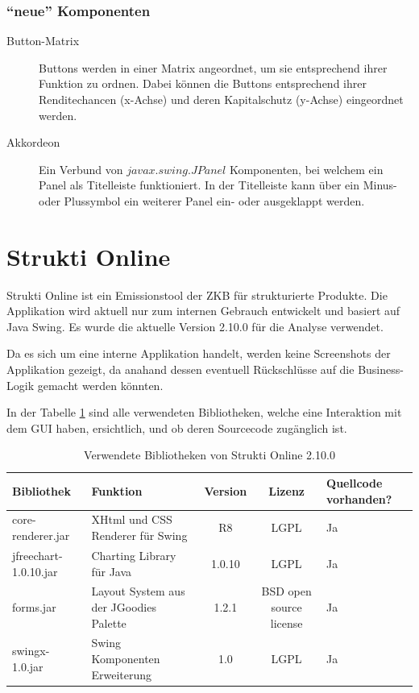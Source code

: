   \subsubsection{``neue'' Komponenten}
  
  \begin{description}
    \item[Button-Matrix]
    Buttons werden in einer Matrix angeordnet, um sie entsprechend ihrer
    Funktion zu ordnen. Dabei können die Buttons entsprechend ihrer
    Renditechancen (x-Achse) und deren Kapitalschutz (y-Achse) eingeordnet
    werden.
    \item[Akkordeon]
    Ein Verbund von \(javax.swing.JPanel\) Komponenten, bei welchem ein
    Panel als Titelleiste funktioniert. In der Titelleiste kann über ein Minus-
    oder Plussymbol ein weiterer Panel ein- oder ausgeklappt werden.
  \end{description}
  
  \section{Strukti Online}
  
  Strukti Online ist ein Emissionstool der \ac{ZKB} für strukturierte Produkte.
  Die Applikation wird aktuell nur zum internen Gebrauch entwickelt und basiert
  auf Java Swing. Es wurde die aktuelle Version 2.10.0 für die Analyse
  verwendet.
  
  Da es sich um eine interne Applikation handelt, werden keine Screenshots
  der Applikation gezeigt, da anahand dessen eventuell Rückschlüsse auf die
  Business-Logik gemacht werden könnten.
  
  In der Tabelle \ref{tab:bibliothekenStruktiOnline} sind alle verwendeten
  Bibliotheken, welche eine Interaktion mit dem \ac{GUI} haben, ersichtlich,
  und ob deren Sourcecode zugänglich ist.
  
  \begin{table}[ht]
    \begin{center}
      \begin{tabular}{lp{4.5cm}ccp{2cm}}
        \toprule
        Bibliothek & Funktion & Version & Lizenz & Quellcode vorhanden?\\
        \midrule
        core-renderer.jar & XHtml und CSS Renderer für Swing & R8 & LGPL & Ja\\
        jfreechart-1.0.10.jar & Charting Library für Java & 1.0.10 & LGPL & Ja\\
        forms.jar & Layout System aus der JGoodies Palette & 1.2.1 & BSD open
        source license & Ja\\
        swingx-1.0.jar & Swing Komponenten Erweiterung & 1.0 & LGPL & Ja\\
        \bottomrule
      \end{tabular}
      \caption{Verwendete Bibliotheken von Strukti Online 2.10.0}
      \label{tab:bibliothekenStruktiOnline}
    \end{center}
  \end{table}
  
